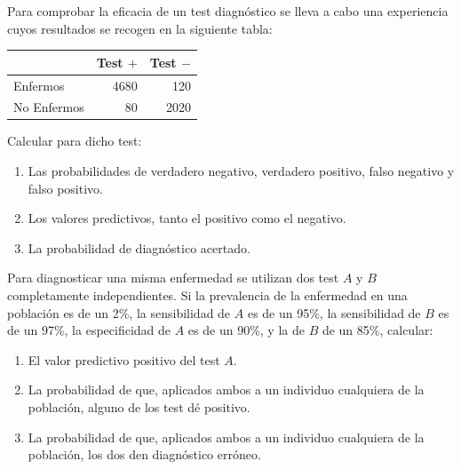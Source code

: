 {Para comprobar la eficacia de un test diagnóstico se lleva a cabo una experiencia cuyos resultados se recogen en la siguiente tabla:
\begin{center}
\begin{tabular}{|l|r|r|}
\cline{2-3}
\multicolumn{1}{l|}{} & Test $+$ & Test $-$ \\
\hline
Enfermos & 4680 & 120 \\
\hline
No Enfermos & 80 & 2020 \\
\hline
\end{tabular}
\end{center}
Calcular para dicho test:
\begin{enumerate}
\item Las probabilidades de verdadero negativo, verdadero positivo, falso negativo y falso positivo.
\item Los valores predictivos, tanto el positivo como el negativo.
\item La probabilidad de diagnóstico acertado.
\end{enumerate}
} 
{
}
{
}


{Para diagnosticar una misma enfermedad se utilizan dos test $A$ y $B$ completamente independientes. Si la prevalencia de la enfermedad en
una población es de un 2\%, la sensibilidad de $A$ es de un 95\%, la sensibilidad de $B$ es de un 97\%, la especificidad de $A$ es de un
90\%, y la de $B$ de un 85\%, calcular:
\begin{enumerate}
\item El valor predictivo positivo del test $A$.
\item La probabilidad de que, aplicados ambos a un individuo cualquiera de la población, alguno de los test dé positivo.
\item La probabilidad de que, aplicados ambos a un individuo cualquiera de la población, los dos den diagnóstico erróneo.
\end{enumerate}
} 
{
}
{
}


